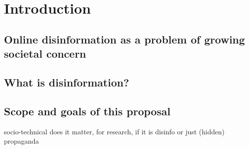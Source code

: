 \section{Introduction}

\subsection{Online disinformation as a problem of growing societal concern}

\subsection{What is disinformation?}

\subsection{Scope and goals of this proposal}
socio-technical
does it matter, for research, if it is disinfo or just (hidden) propaganda